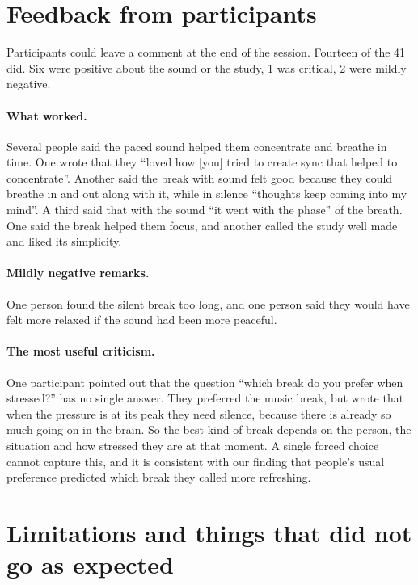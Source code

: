 \documentclass[11pt,a4paper]{article}
\begin{document}
\section{Feedback from participants}

Participants could leave a comment at the end of the session. Fourteen of the 41 did. Six were positive about the sound or the study, 1 was critical, 2 were mildly negative.

\paragraph{What worked.} Several people said the paced sound helped them concentrate and breathe in time. One wrote that they ``loved how [you] tried to create sync that helped to concentrate''. Another said the break with sound felt good because they could breathe in and out along with it, while in silence ``thoughts keep coming into my mind''. A third said that with the sound ``it went with the phase'' of the breath. One said the break helped them focus, and another called the study well made and liked its simplicity.

\paragraph{Mildly negative remarks.} One person found the silent break too long, and one person said they would have felt more relaxed if the sound had been more peaceful.
\paragraph{The most useful criticism.} One participant pointed out that the question ``which break do you prefer when stressed?'' has no single answer. They preferred the music break, but wrote that when the pressure is at its peak they need silence, because there is already so much going on in the brain. So the best kind of break depends on the person, the situation and how stressed they are at that moment. A single forced choice cannot capture this, and it is consistent with our finding that people's usual preference predicted which break they called more refreshing.

\section{Limitations and things that did not go as expected}
\end{document}
